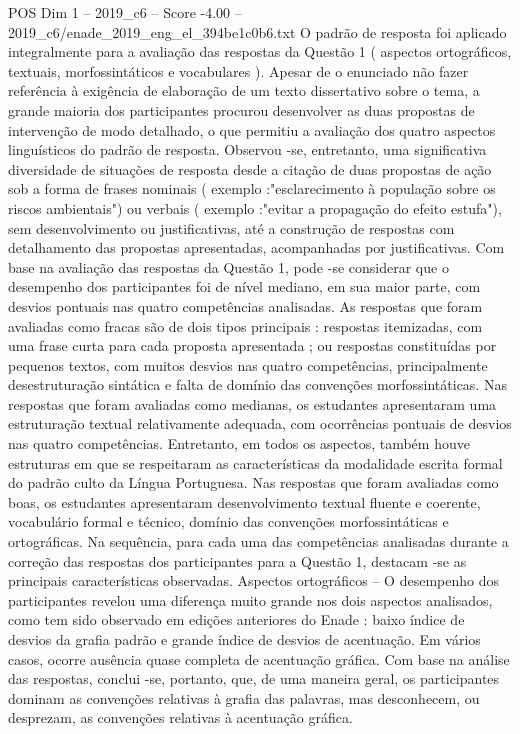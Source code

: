 \begin{textsample}{POS Dim 1 – 2019\_c6 – Score -4.00 – 2019\_c6/enade\_2019\_eng\_el\_394be1c0b6.txt}
O padrão de resposta foi aplicado integralmente para a avaliação das respostas da Questão 1 ( aspectos ortográficos, textuais, morfossintáticos e vocabulares ).
Apesar de o enunciado não fazer referência à exigência de elaboração de um texto dissertativo sobre o tema, a grande maioria dos participantes procurou desenvolver as duas propostas de intervenção de modo detalhado, o que permitiu a avaliação dos quatro aspectos linguísticos do padrão de resposta.
Observou -se, entretanto, uma significativa diversidade de situações de resposta desde a citação de duas propostas de ação sob a forma de frases nominais ( exemplo :"esclarecimento à população sobre os riscos ambientais") ou verbais ( exemplo :"evitar a propagação do efeito estufa"), sem desenvolvimento ou justificativas, até a construção de respostas com detalhamento das propostas apresentadas, acompanhadas por justificativas.
Com base na avaliação das respostas da Questão 1, pode -se considerar que o desempenho dos participantes foi de nível mediano, em sua maior parte, com desvios pontuais nas quatro competências analisadas.
As respostas que foram avaliadas como fracas são de dois tipos principais : respostas itemizadas, com uma frase curta para cada proposta apresentada ; ou respostas constituídas por pequenos textos, com muitos desvios nas quatro competências, principalmente desestruturação sintática e falta de domínio das convenções morfossintáticas.
Nas respostas que foram avaliadas como medianas, os estudantes apresentaram uma estruturação textual relativamente adequada, com ocorrências pontuais de desvios nas quatro competências.
Entretanto, em todos os aspectos, também houve estruturas em que se respeitaram as características da modalidade escrita formal do padrão culto da Língua Portuguesa.
Nas respostas que foram avaliadas como boas, os estudantes apresentaram desenvolvimento textual fluente e coerente, vocabulário formal e técnico, domínio das convenções morfossintáticas e ortográficas.
Na sequência, para cada uma das competências analisadas durante a correção das respostas dos participantes para a Questão 1, destacam -se as principais características observadas.
Aspectos ortográficos – O desempenho dos participantes revelou uma diferença muito grande nos dois aspectos analisados, como tem sido observado em edições anteriores do Enade : baixo índice de desvios da grafia padrão e grande índice de desvios de acentuação.
Em vários casos, ocorre ausência quase completa de acentuação gráfica.
Com base na análise das respostas, conclui -se, portanto, que, de uma maneira geral, os participantes dominam as convenções relativas à grafia das palavras, mas desconhecem, ou desprezam, as convenções relativas à acentuação gráfica.

\end{textsample}
